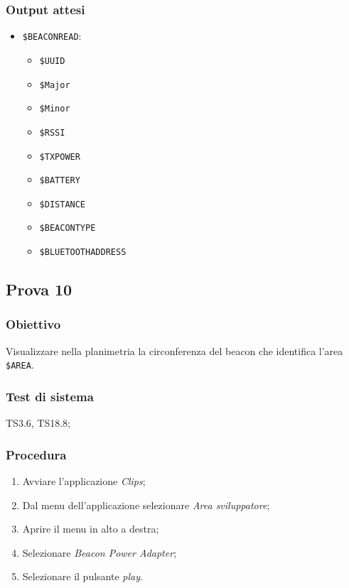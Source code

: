 \documentclass[../Sperimentazione.tex]{subfiles}
\begin{document}
	\subsubsection{Output attesi}
		\begin{itemize}
		\item \verb|$BEACONREAD|:
			\begin{itemize}
				\item \verb|$UUID|
			 	\item \verb|$Major|
			 	\item \verb|$Minor|
			 	\item \verb|$RSSI|
			 	\item \verb|$TXPOWER|
			 	\item \verb|$BATTERY|
			 	\item \verb|$DISTANCE|
			 	\item \verb|$BEACONTYPE|
			 	\item \verb|$BLUETOOTHADDRESS|
			\end{itemize}
			 
		\end{itemize}
		
\newpage
\subsection{Prova 10} %
\label{subsec:Prova10}

	\subsubsection{Obiettivo}
		Visualizzare nella planimetria la circonferenza del beacon che identifica l'area \verb|$AREA|.
	
	\subsubsection{Test di sistema}
		TS3.6, TS18.8;
	
	\subsubsection{Procedura}
		\begin{enumerate}
		\item Avviare l'applicazione \textit{Clips};
		\item Dal menu dell'applicazione selezionare \textit{Area sviluppatore};
		\item Aprire il menu in alto a destra;
		\item Selezionare \textit{Beacon Power Adapter};
		\item Selezionare il pulsante \textit{play}.
		\end{enumerate}
		
\end{document}

